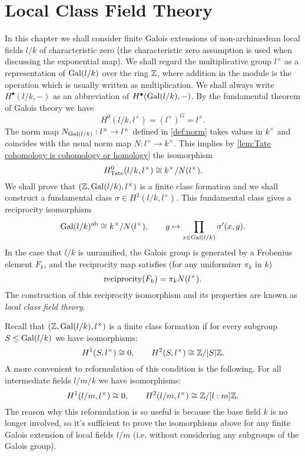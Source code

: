\chapter{Local Class Field Theory}

In this chapter we shall consider finite Galois extensions of non-archimedean local fields $l/k$
of characteristic zero (the characteristic zero assumption is used when discussing the exponential
map).
We shall regard the multiplicative group $l^\times$
as a representation of $\mathrm{Gal}(l/k)$ over the ring ${\mathbb Z}$, where
addition in the module is the operation which is usually written as multiplication.
We shall always write $H^\bullet(l/k,-)$ as an abbreviation of $H^\bullet(\mathrm{Gal}(l/k),-)$.
By the fundamental theorem of Galois theory we have
\[
	H^0(l/k,l^\times) = (l^\times)^G = l^\times.
\]
The norm map $N_{\mathrm{Gal}(l/k)} : l^\times \to l^\times$ defined in \ref{def:norm}
takes values in $k^\times$ and coincides with the usual norm map $N : l^\times \to k^\times$. This implies by
\ref{lem:Tate cohomology is cohomology or homology} the isomorphism
\[
	H^0_{\mathrm{Tate}}(l/k,l^\times) \cong k^\times / N(l^\times).
\]
We shall prove that $({\mathbb Z},\mathrm{Gal}(l/k),l^\times)$ is a finite class formation and we shall construct a
fundamental class $\sigma \in H^2(l/k, l^\times)$.
This fundamental class gives a reciprocity isomorphism
\[
	\mathrm{Gal}(l/k)^{\mathrm{ab}}
	\cong
	k^\times / N(l^\times), \qquad
	g \mapsto \prod_{x \in \mathrm{Gal}(l/k)} \sigma'(x,g).
\]
In the case that $l/k$ is unramified, the Galois group is generated by a Frobenius element $F_k$,
and the reciprocity map satisfies (for any uniformizer $\pi_k$ in $k$)
\[
	\mathrm{reciprocity}(F_k) = \pi_k N(l^\times).
\]
The construction of this reciprocity isomorphism and its properties are known as
\emph{local class field theory}.

Recall that $({\mathbb Z},\mathrm{Gal}(l/k),l^\times)$ is a finite class formation if for every subgroup
$S \le \mathrm{Gal}(l/k)$ we have isomorphisms:
\[
	H^1(S,l^\times) \cong 0, \qquad H^2(S,l^\times) \cong {\mathbb Z} / |S| {\mathbb Z}.
\]
A more convenient to reformulation of this condition is the following.
For all intermediate fields $l / m / k$ we have isomorphisms:
\[
	H^1(l/m,l^\times) \cong 0, \qquad H^2(l/m,l^\times) \cong {\mathbb Z} / [l:m] {\mathbb Z}.
\]
The reason why this reformulation is so useful is because the base field $k$ is no longer involved,
so it's sufficient to prove the isomorphisms above for any finite Galois extension of local fields $l/m$
(i.e. without considering any subgroups of the Galois group).

